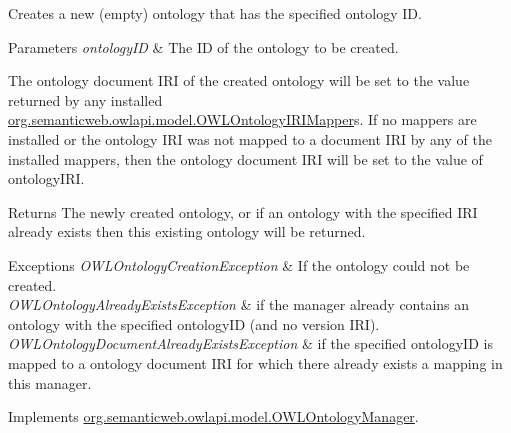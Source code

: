 Creates a new (empty) ontology that has the specified ontology I\-D. 
\begin{DoxyParams}{Parameters}
{\em ontology\-I\-D} & The I\-D of the ontology to be created. \\
\hline
\end{DoxyParams}
The ontology document I\-R\-I of the created ontology will be set to the value returned by any installed \hyperlink{interfaceorg_1_1semanticweb_1_1owlapi_1_1model_1_1_o_w_l_ontology_i_r_i_mapper}{org.\-semanticweb.\-owlapi.\-model.\-O\-W\-L\-Ontology\-I\-R\-I\-Mapper}s. If no mappers are installed or the ontology I\-R\-I was not mapped to a document I\-R\-I by any of the installed mappers, then the ontology document I\-R\-I will be set to the value of {\ttfamily ontology\-I\-R\-I}. \begin{DoxyReturn}{Returns}
The newly created ontology, or if an ontology with the specified I\-R\-I already exists then this existing ontology will be returned. 
\end{DoxyReturn}

\begin{DoxyExceptions}{Exceptions}
{\em O\-W\-L\-Ontology\-Creation\-Exception} & If the ontology could not be created. \\
\hline
{\em O\-W\-L\-Ontology\-Already\-Exists\-Exception} & if the manager already contains an ontology with the specified {\ttfamily ontology\-I\-D} (and no version I\-R\-I). \\
\hline
{\em O\-W\-L\-Ontology\-Document\-Already\-Exists\-Exception} & if the specified {\ttfamily ontology\-I\-D} is mapped to a ontology document I\-R\-I for which there already exists a mapping in this manager. \\
\hline
\end{DoxyExceptions}


Implements \hyperlink{interfaceorg_1_1semanticweb_1_1owlapi_1_1model_1_1_o_w_l_ontology_manager_a9da24de8897863f41133ede82107ff94}{org.\-semanticweb.\-owlapi.\-model.\-O\-W\-L\-Ontology\-Manager}.

